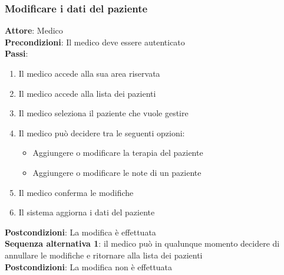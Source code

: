 \documentclass[a4paper]{article}
\begin{document}
\subsubsection{Modificare i dati del paziente}
\begin{mdframed}
	\textbf{Attore}: Medico\\
	\textbf{Precondizioni}: Il medico deve essere autenticato\\
	\textbf{Passi}: 
	\begin{enumerate}[nosep]
	  \item Il medico accede alla sua area riservata
	  \item Il medico accede alla lista dei pazienti
	  \item Il medico seleziona il paziente che vuole gestire
	  \item Il medico può decidere tra le seguenti opzioni:
	  \begin{itemize}
		\item Aggiungere o modificare la terapia del paziente
		\item Aggiungere o modificare le note di un paziente
	  \end{itemize}
	  \item Il medico conferma le modifiche
	  \item Il sistema aggiorna i dati del paziente
	\end{enumerate}
	\textbf{Postcondizioni}: La modifica è effettuata\\
	\textbf{Sequenza alternativa 1}: il medico può in qualunque momento decidere di annullare le modifiche
	e ritornare alla lista dei pazienti\\
	\textbf{Postcondizioni}: La modifica non è effettuata
  \end{mdframed}
  \noindent
\end{document}
